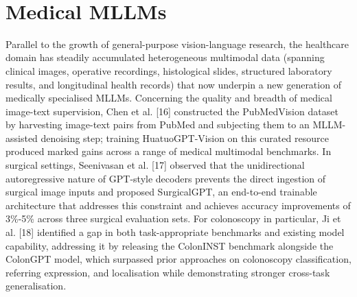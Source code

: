 ﻿﻿\documentclass[12pt]{report}
\begin{document}
\section{Medical MLLMs}
Parallel to the growth of general-purpose vision-language research, the healthcare domain has steadily accumulated heterogeneous multimodal data (spanning clinical images, operative recordings, histological slides, structured laboratory results, and longitudinal health records) that now underpin a new generation of medically specialised MLLMs. Concerning the quality and breadth of medical image-text supervision, Chen et al. [16] constructed the PubMedVision dataset by harvesting image-text pairs from PubMed and subjecting them to an MLLM-assisted denoising step; training HuatuoGPT-Vision on this curated resource produced marked gains across a range of medical multimodal benchmarks. In surgical settings, Seenivasan et al. [17] observed that the unidirectional autoregressive nature of GPT-style decoders prevents the direct ingestion of surgical image inputs and proposed SurgicalGPT, an end-to-end trainable architecture that addresses this constraint and achieves accuracy improvements of 3\%-5\% across three surgical evaluation sets. For colonoscopy in particular, Ji et al. [18] identified a gap in both task-appropriate benchmarks and existing model capability, addressing it by releasing the ColonINST benchmark alongside the ColonGPT model, which surpassed prior approaches on colonoscopy classification, referring expression, and localisation while demonstrating stronger cross-task generalisation. 
\end{document}
